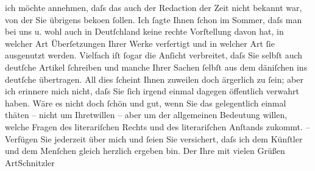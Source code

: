 \begin{ledgroupsized}[t]{13cm}
               ich möchte annehmen, daſs das auch der Redaction der Zeit nicht bekannt war, von der Sie übrigens \label{K_L00602-1v}\label{K_L00602-1h} beko{\geminationm}en
               ſollen. Ich ſagte Ihnen ſchon im Sommer, daſs man bei uns u. wohl auch in Deutſchland keine rechte Vorſtellung davon hat, in
               welcher Art Überſetzungen Ihrer Werke verfertigt und in welcher Art ſie ausgenutzt
               werden. Vielfach iſt ſogar die Anſicht verbreitet, daſs Sie selbſt auch deutſche
               Artikel ſchreiben und manche Ihrer Sachen ſelbſt aus dem däniſchen ins deutſche übertragen.\pend
           \pstart
           {\pb}All dies ſcheint Ihnen zuweilen doch ärgerlich zu
               ſein; aber ich erinnere mich nicht, daſs Sie ſich irgend einmal dagegen öffentlich
               verwahrt haben.\pend
           \pstart
           Wäre es nicht doch ſchön und gut, wenn Sie das gelegentlich einmal thäten – nicht um
               Ihretwillen – aber um der allgemeinen Bedeutung willen, welche Fragen des
               literariſchen Rechts und des literariſchen Anſtands zukommt. –\pend
           \pstart
           Verfügen Sie jederzeit über mich und ſeien Sie versichert, daſs ich dem Künſtler und
               dem Menſchen gleich herzlich ergeben bin.\pend
           \pstart Der Ihre mit vielen Grüßen \spacefill\mbox{ArtSchnitzler}\pend{}
         
         \endnumbering{}\end{ledgroupsized}  \newcommand{\dateiname}{L00602}\newcommand{\titel}{Arthur Schnitzler an Georg Brandes, 8. 10. 1896}\newcommand{\editorInnen}{Martin Anton Müller und Gerd-Hermann Susen}
      